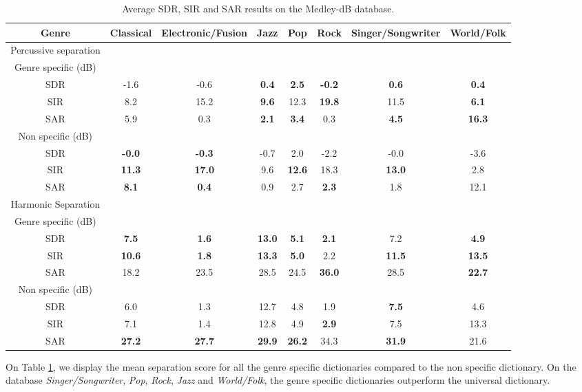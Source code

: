 \documentclass{article}
\begin{document}
\begin{table}
   
\begin{tabular}{|c|c|c|c|c|c|c|c|}
\hline   
Genre & Classical & Electronic/Fusion & Jazz & Pop & Rock & Singer/Songwriter & World/Folk \\
\hline
Percussive separation & & & & & & & \\
\hline
Genre specific (dB)  & & & & & & & \\
SDR & -1.6     & -0.6     &\bf{0.4} & \bf{2.5}&\bf{-0.2}& \bf{0.6} & \bf{0.4} \\
SIR & 8.2      & 15.2     &\bf{9.6} & 12.3    &\bf{19.8}& 11.5     & \bf{6.1} \\
SAR & 5.9      & 0.3      &\bf{2.1} & \bf{3.4}& 0.3    & \bf{4.5} & \bf{16.3} \\
\hline
Non specific (dB) & & & & & & &\\
SDR & \bf{-0.0}& \bf{-0.3}& -0.7    & 2.0     & -2.2    & -0.0     & -3.6 \\
SIR & \bf{11.3} & \bf{17.0}& 9.6     &\bf{12.6}& 18.3    & \bf{13.0}& 2.8 \\
SAR & \bf{8.1} & \bf{0.4} & 0.9     & 2.7     &\bf{2.3} & 1.8      & 12.1 \\
\hline   
Harmonic Separation &  & & & & & & \\  
\hline
Genre specific (dB)  & & & & & & & \\
SDR & \bf{7.5}    & \bf{1.6}    & \bf{13.0} & \bf{5.1}  & \bf{2.1}& 7.2      &\bf{4.9} \\
SIR & \bf{10.6}   & \bf{1.8}    & \bf{13.3} & \bf{5.0 } & 2.2     & \bf{11.5}& \bf{13.5} \\
SAR & 18.2       & 23.5       & 28.5      & 24.5      &\bf{36.0}& 28.5     & \bf{22.7} \\
\hline
Non specific (dB) & & & & & & &\\
SDR & 6.0        & 1.3       & 12.7     & 4.8      & 1.9      & \bf{7.5}      & 4.6\\
SIR & 7.1       & 1.4        & 12.8     & 4.9      & \bf{2.9} & 7.5      & 13.3 \\
SAR & \bf{27.2}& \bf{27.7}   & \bf{29.9} & \bf{26.2}& 34.3     &\bf{31.9} & 21.6\\
\hline
  \end{tabular} 
\caption{\label{specresults} Average SDR, SIR and SAR results on the Medley-dB database.}
\end{table}



On Table \ref{specresults}, we display the mean separation score for all the genre specific dictionaries compared to the non specific dictionary. On the database \emph{Singer/Songwriter}, \emph{Pop}, \emph{Rock}, \emph{Jazz} and \emph{World/Folk}, the genre specific dictionaries outperform the universal dictionary. %
\end{document}

